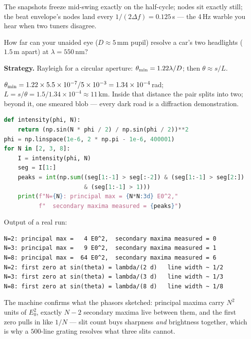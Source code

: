 The snapshots freeze mid-swing exactly on the half-cycle; nodes sit
exactly still; the beat envelope's nodes land every
$1/(2\Delta f)=0.125$\,s --- the 4\,Hz warble you hear when two tuners
disagree.

\begin{example}\label{ex:headlight}
How far can your unaided eye ($D\approx5$\,mm pupil) resolve a car's
two headlights ($1.5$\,m apart) at $\lambda=550$\,nm?
\par\smallskip
\textbf{Strategy.} Rayleigh for a circular aperture:
$\theta_{\rm min}=1.22\lambda/D$; then $\theta\approx s/L$.
\begin{solution}
$\theta_{\rm min}=1.22\times5.5\times10^{-7}/5\times10^{-3}
=1.34\times10^{-4}$\,rad;
$L=s/\theta=1.5/1.34\times10^{-4}\approx11$\,km.
Inside that distance the pair splits into two; beyond it, one smeared
blob --- every dark road is a diffraction demonstration.
\checkmark
\end{solution}
\end{example}

\begin{lstlisting}[language=Python,caption={\texttt{code/ch16\_nslit.py} --- $N$-slit intensity: principal maxima fixed, lines sharpen, satellites counted.},label={lst:nslit}]
def intensity(phi, N):
    return (np.sin(N * phi / 2) / np.sin(phi / 2))**2
phi = np.linspace(1e-6, 2 * np.pi - 1e-6, 400001)
for N in [2, 3, 8]:
    I = intensity(phi, N)
    seg = I[1:]
    peaks = int(np.sum((seg[1:-1] > seg[:-2]) & (seg[1:-1] > seg[2:])
                       & (seg[1:-1] > 1)))
    print(f"N={N}: principal max = {N*N:3d} E0^2,"
          f"  secondary maxima measured = {peaks}")
\end{lstlisting}

Output of a real run:
\begin{lstlisting}[numbers=none]
N=2: principal max =   4 E0^2,  secondary maxima measured = 0
N=3: principal max =   9 E0^2,  secondary maxima measured = 1
N=8: principal max =  64 E0^2,  secondary maxima measured = 6
N=2: first zero at sin(theta) = lambda/(2 d)   line width ~ 1/2
N=3: first zero at sin(theta) = lambda/(3 d)   line width ~ 1/3
N=8: first zero at sin(theta) = lambda/(8 d)   line width ~ 1/8
\end{lstlisting}

The machine confirms what the phasors sketched: principal maxima
carry $N^{2}$ units of $E_0^{2}$, exactly $N-2$ secondary maxima
live between them, and the first zero pulls in like $1/N$ ---
slit count buys sharpness \emph{and} brightness together, which is
why a $500$-line grating resolves what three slits cannot.

